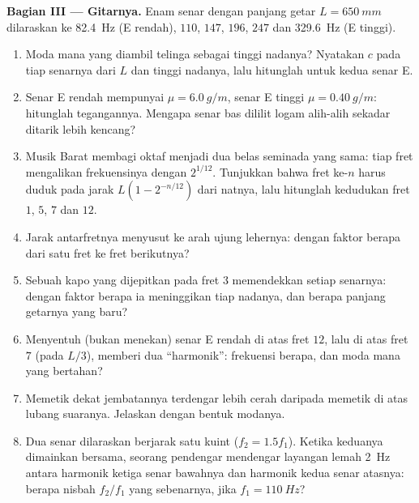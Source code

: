 \begin{problem}
\medskip
\noindent\textbf{Bagian III --- Gitarnya.}
Enam senar dengan panjang getar $L = \qty{650}{mm}$ dilaraskan ke
\qty{82.4}{Hz} (E rendah), $110$, $147$, $196$, $247$ dan \qty{329.6}{Hz}
(E tinggi).
\begin{enumerate}[resume]
  \item Moda mana yang diambil telinga sebagai tinggi nadanya? Nyatakan
        $c$ pada tiap senarnya dari $L$ dan tinggi nadanya, lalu
        hitunglah untuk kedua senar E.
  \item Senar E rendah mempunyai $\mu = \qty{6.0}{g/m}$, senar E tinggi
        $\mu = \qty{0.40}{g/m}$: hitunglah tegangannya. Mengapa senar
        bas dililit logam alih-alih sekadar ditarik lebih kencang?
  \item Musik Barat membagi oktaf menjadi dua belas seminada yang sama:
        tiap fret mengalikan frekuensinya dengan $2^{1/12}$. Tunjukkan
        bahwa fret ke-$n$ harus duduk pada jarak $L(1 - 2^{-n/12})$ dari
        natnya, lalu hitunglah kedudukan fret $1$, $5$, $7$ dan $12$.
  \item Jarak antarfretnya menyusut ke arah ujung lehernya: dengan
        faktor berapa dari satu fret ke fret berikutnya?
  \item Sebuah kapo yang dijepitkan pada fret $3$ memendekkan setiap
        senarnya: dengan faktor berapa ia meninggikan tiap nadanya, dan
        berapa panjang getarnya yang baru?
  \item Menyentuh (bukan menekan) senar E rendah di atas fret $12$, lalu
        di atas fret $7$ (pada $L/3$), memberi dua ``harmonik'':
        frekuensi berapa, dan moda mana yang bertahan?
  \item Memetik dekat jembatannya terdengar lebih cerah daripada memetik
        di atas lubang suaranya. Jelaskan dengan bentuk modanya.
  \item Dua senar dilaraskan berjarak satu kuint ($f_2 = 1.5f_1$).
        Ketika keduanya dimainkan bersama, seorang pendengar mendengar
        layangan lemah \qty{2}{Hz} antara harmonik ketiga senar bawahnya
        dan harmonik kedua senar atasnya: berapa nisbah $f_2/f_1$ yang
        sebenarnya, jika $f_1 = \qty{110}{Hz}$?
\end{enumerate}


\end{problem}
